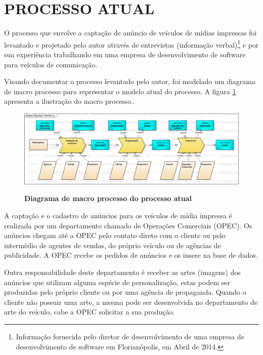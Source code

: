 \documentclass[
	12pt,				%
	openright,			%
	oneside,			%
	a4paper,			%
	chapter=TITLE,		%
	section=TITLE,		%
	english,			%
	french,				%
	spanish,			%
	brazil				%
	]{abntex2}
\begin{document}
\section{PROCESSO ATUAL}
O processo que envolve a captação de anúncio de veículos de mídias impressas foi levantado e projetado pelo autor através de entrevistas (informação verbal)\footnote{Informação fornecida pelo diretor de desenvolvimento de uma empresa de desenvolvimento de software em Florianópolis, em Abril de 2014.} e por sua experiência trabalhando em uma empresa de desenvolvimento de software para veículos de comunicação.

Visando documentar o processo levantado pelo autor, foi modelado um diagrama de macro processo para representar o modelo atual do processo. A figura \ref{fig-diag-macroprocesso} apresenta a ilustração do macro processo..

\begin{figure}[htb]
	\begin{center}
		\caption{
			\textbf{Diagrama de macro processo do processo atual}
		}\label{fig-diag-macroprocesso}
		\includegraphics [scale=0.4]{imagens/diagrama_macro_processo.png}
		\label{fig-diag-macroprocesso}
	\end{center}
\end{figure}


A captação e o cadastro de anúncios para os veículos de mídia impressa é realizada por um departamento chamado de Operações Comerciais (OPEC). Os anúncios chegam até a OPEC pelo contato direto com o cliente ou pelo intermédio de agentes de vendas, do próprio veículo ou de agências de publicidade. A OPEC recebe os pedidos de anúncios e os insere na base de dados.

Outra responsabilidade deste departamento é receber as artes (imagens) dos anúncios que utilizam alguma espécie de personalização, estas podem ser produzidas pelo próprio cliente ou por uma agência de propaganda. Quando o cliente não possuir uma arte, a mesma pode ser desenvolvida no departamento de arte do veículo, cabe a OPEC solicitar a sua produção.
\end{document}
